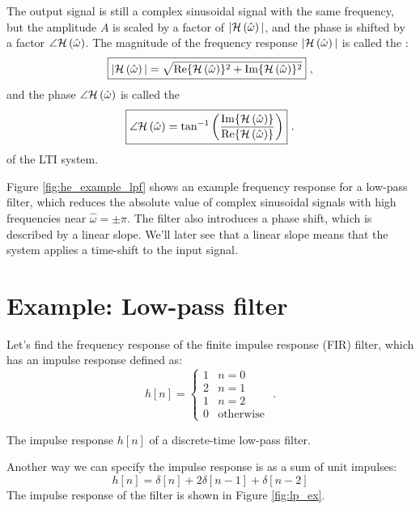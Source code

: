 The output signal is still a complex sinusoidal signal with the same
frequency, but the amplitude $A$ is scaled by a factor of $|\mathcal{H}\left(\hat{\omega}\right)|$, and the
phase is shifted by a factor $\angle \mathcal{H}\left(\hat{\omega}\right)$. The magnitude of the
frequency response $|\mathcal{H}\left(\hat{\omega}\right)|$ is called the \emph{}:
\begin{equation}
    \boxed{
        |\mathcal{H}\left(\hat{\omega}\right)|=\sqrt{\Re\{\mathcal{H}\left(\hat{\omega}\right)\}^2+\Im\{\mathcal{H}\left(\hat{\omega}\right)\}^2}
    } \,\,,
\end{equation}
and the phase $\angle \mathcal{H}\left(\hat{\omega}\right)$ is called
the \emph{}
\begin{equation}
    \boxed{
        \angle \mathcal{H}\left(\hat{\omega}\right) = \tan^{-1}\left(\frac{\Im\{\mathcal{H}\left(\hat{\omega}\right)\}}{\Re\{\mathcal{H}\left(\hat{\omega}\right)\}}\right)
    } \,\,.
\end{equation}
of the LTI system.

Figure \ref{fig:he_example_lpf} shows an example frequency response
for a low-pass filter, which reduces the absolute value of complex
sinusoidal signals with high frequencies near
$\hat{\omega}=\pm \pi$. The filter also introduces a phase shift,
which is described by a linear slope. We'll later see that a linear
slope means that the system applies a time-shift to the input signal.

\section{Example: Low-pass filter}

Let's find the frequency response of the finite impulse response (FIR)
filter, which has an impulse response defined as:
\begin{equation}
    h[n] = \left\{\begin{array}{cc}
        1 & n=0                \\
        2 & n=1                \\
        1 & n=2                \\
        0 & \mathrm{otherwise}
    \end{array} \,\,.
    \right.
\end{equation}
\begin{marginfigure}
    \begin{center}
    \end{center}
    \caption{The impulse response $h[n]$ of a discrete-time low-pass filter.}
    \label{fig:lp_ex}
\end{marginfigure}
\noindent Another way we can specify the impulse response is as a sum of unit impulses:
\begin{equation}
    h[n] = \delta[n] + 2\delta[n-1] + \delta[n-2]
\end{equation}
The impulse response of the filter is shown in Figure \ref{fig:lp_ex}.

